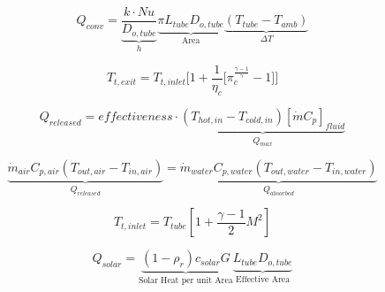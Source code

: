 \begin{equation}
Q_{conv} = \underbrace{ \frac{k\cdot Nu}{ {D}_{o,tube}} }_\text{$h$}
 \underbrace{ \pi {L}_{tube} {D}_{o,tube} }_\text{Area}
 \underbrace{ (T_{tube}-T_{amb})  }_\text{$\Delta T$}
\end{equation}

\begin{equation}
T_{t,exit} = T_{t,inlet} \Bigg[ 1 + \frac{1}{\eta_{c}} \Big[ \pi_{c}^{\frac{\gamma-1}{\gamma}}- 1 \Big] \Bigg]
\end{equation}

\begin{equation}
{Q}_{released}  = effectiveness \cdot \underbrace{\left(T_{hot,in} - T_{cold,in}\right) [ \dot{m} C_{p} ]_{fluid}}_\text{${Q}_{max}$}
\end{equation}

\begin{equation}
\underbrace{\dot{m}_{air} C_{p, air} (T_{out, air} - T_{in, air})}_{{Q}_{released}}  = \underbrace{\dot{m}_{water} C_{p,water} (T_{out, water} - T_{in, water})}_{{Q}_{absorbed}}
\end{equation}

\begin{equation}
T_{t,inlet} = T_{tube} [1 + \frac{\gamma -1}{2} M^2]
\end{equation}

\begin{equation}
Q_{solar} = \underbrace{ (1- \rho_{r})  c_{solar}G}_\text{Solar Heat per unit Area} \underbrace{L_{tube}  D_{o,tube}}_\text{Effective Area}
\end{equation}
